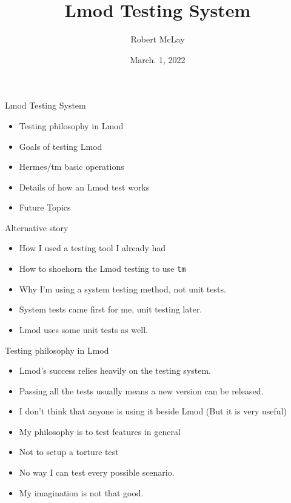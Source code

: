 \documentclass{beamer}
\begin{document}
\title[Lmod]{Lmod Testing System}
\author{Robert McLay} 
\date{March. 1, 2022}

\frame{\titlepage} 


\begin{frame}{Lmod Testing System}
  \begin{itemize}
    \item Testing philosophy in Lmod
    \item Goals of testing Lmod
    \item Hermes/tm basic operations
    \item Details of how an Lmod test works
    \item Future Topics
  \end{itemize}
\end{frame}

\begin{frame}{Alternative story}
  \begin{itemize}
    \item How I used a testing tool I already had
    \item How to shoehorn the Lmod testing to use \texttt{tm}
    \item Why I'm using a system testing method, not unit tests.
    \item System tests came first for me, unit testing later.
    \item Lmod uses some unit tests as well.
  \end{itemize}
\end{frame}

\begin{frame}{Testing philosophy in Lmod}
  \begin{itemize}
    \item Lmod's success relies heavily on the testing system.
    \item Passing all the tests usually means a new version can be released.
    \item I don't think that anyone is using it beside Lmod (But it is
      very useful)
    \item My philosophy is to test features in general
    \item Not to setup a torture test
    \item No way I can test every possible scenario.
    \item My imagination is not that good.
  \end{itemize}
\end{frame}
\end{document}
